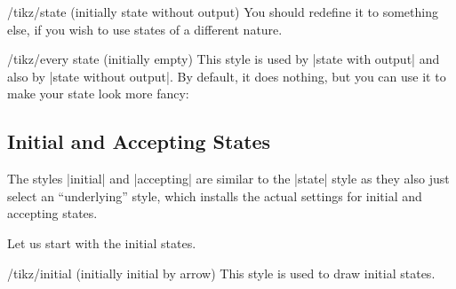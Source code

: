 \begin{stylekey}{/tikz/state (initially state without output)}
    You should redefine it to something else, if you wish to use states of a
    different nature.
\begin{codeexample}[preamble={\usetikzlibrary{automata}}]
\end{codeexample}
\end{stylekey}

\begin{stylekey}{/tikz/every state (initially \normalfont empty)}
    This style is used by |state with output| and also by
    |state without output|. By default, it does nothing, but you can use it to
    make your state look more fancy:
\begin{codeexample}[preamble={\usetikzlibrary{arrows.meta,automata,positioning}}]
\end{codeexample}
\end{stylekey}


\subsection{Initial and Accepting States}

The styles |initial| and |accepting| are similar to the |state| style as they
also just select an ``underlying'' style, which installs the actual settings
for initial and accepting states.

Let us start with the initial states.
%
\begin{stylekey}{/tikz/initial (initially initial by arrow)}
    This style is used to draw initial states.
\end{stylekey}

